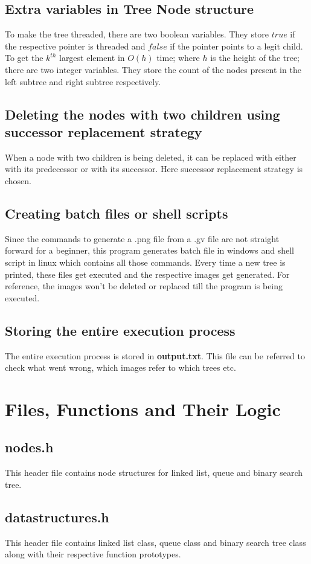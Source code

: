 \documentclass{article}
\begin{document}
\subsection{Extra variables in Tree Node structure}
To make the tree threaded, there are two boolean variables. They store $true$ if the respective pointer is threaded and $false$ if the pointer points to a legit child.\newline
To get the $k^{th}$ largest element in $O(h)$ time; where $h$ is the height of the tree; there are two integer variables. They store the count of the nodes present in the left subtree and right subtree respectively.
\subsection{Deleting the nodes with two children using successor replacement strategy}
When a node with two children is being deleted, it can be replaced with either with its predecessor or with its successor. Here successor replacement strategy is chosen.
\subsection{Creating batch files or shell scripts}
Since the commands to generate a .png file from a .gv file are not straight forward for a beginner, this program generates batch file in windows and shell script in linux which contains all those commands. Every time a new tree is printed, these files get executed and the respective images get generated. For reference, the images won't be deleted or replaced till the program is being executed.
\subsection{Storing the entire execution process}
The entire execution process is stored in \textbf{output.txt}. This file can be referred to check what went wrong, which images refer to which trees etc.

\section{Files, Functions and Their Logic}
\subsection{nodes.h}
This header file contains node structures for linked list, queue and binary search tree.

\subsection{datastructures.h}
This header file contains linked list class, queue class and binary search tree class along with their respective function prototypes.
\end{document}
